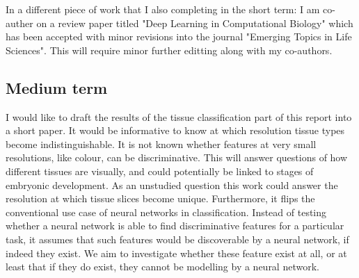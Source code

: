\documentclass[graybox]{svmult}
\begin{document}
In a different piece of work that I also completing in the short term: I am co-auther on a review paper titled "Deep Learning in Computational Biology" which has been accepted with minor revisions into the journal "Emerging Topics in Life Sciences". This will require minor further editting along with my co-authors.


\subsection{Medium term}

I would like to draft the results of the tissue classification part of this report into a short paper. It would be informative to know at which resolution tissue types become indistinguishable. It is not known whether features at very small resolutions, like colour, can be discriminative. This will answer questions of how different tissues are visually, and could potentially be linked to stages of embryonic development. As an unstudied question this work could answer the resolution at which tissue slices become unique. Furthermore, it flips the conventional use case of neural networks in classification. Instead of testing whether a neural network is able to find discriminative features for a particular task, it assumes that such features would be discoverable by a neural network, if indeed they exist. We aim to investigate whether these feature exist at all, or at least that if they do exist, they cannot be modelling by a neural network.

\end{document}

